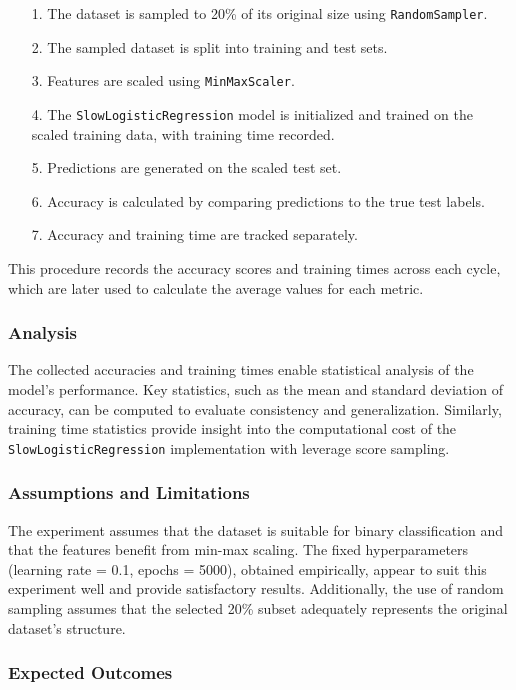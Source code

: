 \documentclass{article}
\theoremstyle{plain}
\theoremstyle{definition}
\theoremstyle{remark}
\begin{document}
\begin{itemize}
	\item [1.] The dataset is sampled to 20\% of its original size using \texttt{RandomSampler}.
	\item [2.] The sampled dataset is split into training and test sets.
	\item [3.] Features are scaled using \texttt{MinMaxScaler}.
	\item [4.] The \texttt{SlowLogisticRegression} model is initialized and trained on the scaled training data, with training time recorded.
	\item [5.] Predictions are generated on the scaled test set.
	\item [6.] Accuracy is calculated by comparing predictions to the true test labels.
	\item [7.] Accuracy and training time are tracked separately.
\end{itemize}

This procedure records the accuracy scores and training times across each cycle, which are later used to calculate the average values for each metric.

\subsubsection{Analysis}

The collected accuracies and training times enable statistical analysis of the model's performance. Key statistics, such as the mean and standard deviation of accuracy, can be computed to evaluate consistency and generalization. Similarly, training time statistics provide insight into the computational cost of the \texttt{SlowLogisticRegression} implementation with leverage score sampling.

\subsubsection{Assumptions and Limitations}

The experiment assumes that the dataset is suitable for binary classification and that the features benefit from min-max scaling. The fixed hyperparameters (learning rate = 0.1, epochs = 5000), obtained empirically, appear to suit this experiment well and provide satisfactory results. Additionally, the use of random sampling assumes that the selected 20\% subset adequately represents the original dataset's structure.

\subsubsection{Expected Outcomes}
\end{document}
